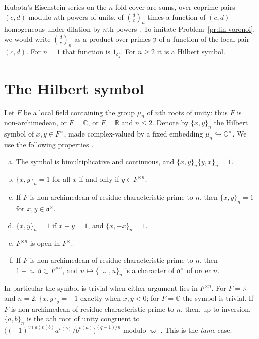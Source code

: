\documentclass[reqno]{amsart}
\providecommand{\qr}[2]{\left(\frac{#1}{#2}\right)}
\newcommand{\oo}{\mathfrak{o}}
\newcommand{\pp}{\mathfrak{p}}
\numberwithin{equation}{section}
\theoremstyle{definition}
\theoremstyle{plain}
\begin{document}
Kubota's Eisenstein series on the $n$-fold cover are sums, over coprime pairs $(c, d)$ modulo $n$th powers of units, of $\qr{d}{c}_n$ times a function of $(c, d)$ homogeneous under dilation by $n$th powers \cite{Kub69}.  To imitate Problem~\ref{pr:lin-voronoi}, we would write $\qr{d}{c}_n$ as a product over primes $\pp$ of a function of the local pair $(c, d)$.  For $n = 1$ that function is $1_{\oo_\pp^2}$.  For $n \geq 2$ it is a Hilbert symbol.

\section{The Hilbert symbol}\label{sec:hilbert}

Let $F$ be a local field containing the group $\mu_n$ of $n$th roots of unity: thus $F$ is non-archimedean, or $F = \mathbb{C}$, or $F = \mathbb{R}$ and $n \leq 2$.  Denote by $\{x, y\}_n$ the Hilbert symbol of $x, y \in F^\times$, made complex-valued by a fixed embedding $\mu_n \hookrightarrow \mathbb{C}^\times$.  We use the following properties \cite[Ch.~V, Proposition~3.2]{Neu}.
\begin{enumerate}[(a)]
\item\label{h:bimult} The symbol is bimultiplicative and continuous, and $\{x, y\}_n \{y, x\}_n = 1$.
\item\label{h:powers} $\{x, y\}_n = 1$ for all $x$ if and only if $y \in F^{\times n}$.
\item\label{h:units} If $F$ is non-archimedean of residue characteristic prime to $n$, then $\{x, y\}_n = 1$ for $x, y \in \oo^\times$.
\item\label{h:steinberg} $\{x, y\}_n = 1$ if $x + y = 1$, and $\{x, -x\}_n = 1$.
\item\label{h:open} $F^{\times n}$ is open in $F^\times$.
\item\label{h:tame} If $F$ is non-archimedean of residue characteristic prime to $n$, then $1 + \varpi \oo \subset F^{\times n}$, and $u \mapsto \{\varpi, u\}_n$ is a character of $\oo^\times$ of order $n$.
\end{enumerate}
In particular the symbol is trivial when either argument lies in $F^{\times n}$.  For $F = \mathbb{R}$ and $n = 2$, $\{x, y\}_2 = -1$ exactly when $x, y < 0$; for $F = \mathbb{C}$ the symbol is trivial.  If $F$ is non-archimedean of residue characteristic prime to $n$, then, up to inversion, $\{a, b\}_n$ is the $n$th root of unity congruent to $\bigl( (-1)^{v(a) v(b)} a^{v(b)} / b^{v(a)} \bigr)^{(q-1)/n}$ modulo $\varpi$ \cite[Ch.~V, Proposition~3.4]{Neu}.  This is the \emph{tame} case.
\end{document}
